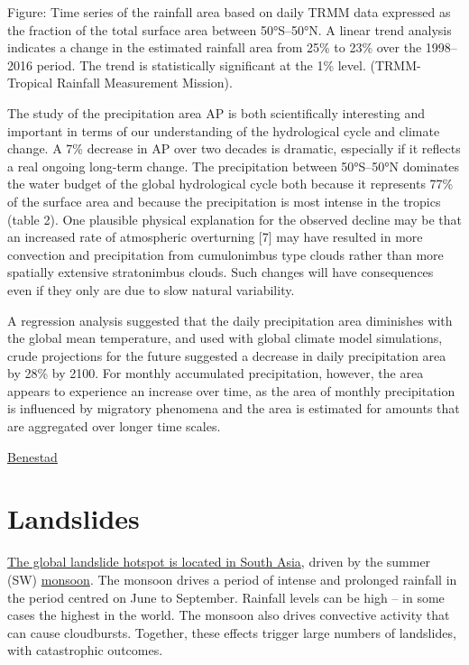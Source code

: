 \documentclass[
]{book}
\begin{document}
Figure: Time series of the rainfall area based on daily TRMM data expressed as the fraction of the total surface area between 50°S--50°N. A linear trend analysis indicates a change in the estimated rainfall area from 25\% to 23\% over the 1998--2016 period. The trend is statistically significant at the 1\% level.
(TRMM- Tropical Rainfall Measurement Mission).

The study of the precipitation area AP is both scientifically interesting and important in terms of our understanding of the hydrological cycle and climate change. A 7\% decrease in AP over two decades is dramatic, especially if it reflects a real ongoing long-term change. The precipitation between 50°S--50°N dominates the water budget of the global hydrological cycle both because it represents 77\% of the surface area and because the precipitation is most intense in the tropics (table 2). One plausible physical explanation for the observed decline may be that an increased rate of atmospheric overturning {[}7{]} may have resulted in more convection and precipitation from cumulonimbus type clouds rather than more spatially extensive stratonimbus clouds. Such changes will have consequences even if they only are due to slow natural variability.

A regression analysis suggested that the daily precipitation area diminishes with the global mean temperature, and used with global climate model simulations, crude projections for the future suggested a decrease in daily precipitation area by 28\% by 2100. For monthly accumulated precipitation, however, the area appears to experience an increase over time, as the area of monthly precipitation is influenced by migratory phenomena and the area is estimated for amounts that are aggregated over longer time scales.

\href{https://iopscience.iop.org/article/10.1088/1748-9326/aab375}{Benestad}

\hypertarget{landslides}{%
\section{Landslides}\label{landslides}}

\href{https://blogs.agu.org/landslideblog/2018/08/24/global-fatal-landslide-occurrence-1/}{The global landslide hotspot is located in South Asia}, driven by the summer (SW) \href{https://blogs.agu.org/landslideblog/?s=monsoon\&submit.x=0\&submit.y=0\&mswhere=blog}{monsoon}. The monsoon drives a period of intense and prolonged rainfall in the period centred on June to September. Rainfall levels can be high -- in some cases the highest in the world. The monsoon also drives convective activity that can cause cloudbursts. Together, these effects trigger large numbers of landslides, with catastrophic outcomes.
\end{document}
